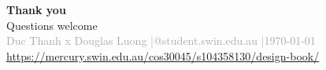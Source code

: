 \documentclass[aspectratio=169]{beamer}
\begin{document}
\begin{frame}[plain]
  \begin{center}
    \vspace{1.5cm}
    {\Large \textbf{Thank you}}\\[0.8em]
    {\normalsize Questions welcome}\\[1.5em]
    \textcolor{darkgray}{\small Duc Thanh x Douglas Luong \quad|@student.swin.edu.au \quad|\quad \today}\\[0.6em]
    {\footnotesize\url{https://mercury.swin.edu.au/cos30045/s104358130/design-book/}}
  \end{center}
\end{frame}
\end{document}
